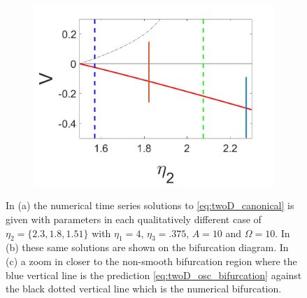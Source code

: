 \begin{figure}[H]
\begin{subfigure}{.5\textwidth}
 \includegraphics[width=\linewidth]{twoD/osc_bif_diagram_zoom.jpg}
 \caption{}
\end{subfigure}
\caption{In (a) the numerical time series solutions to \eqref{eq:twoD_canonical} is given with parameters in each qualitatively different case of $\eta_2=\{2.3,1.8,1.51\}$ with $\eta_1=4$, $\eta_3=.375$, $A=10$ and $\Omega = 10$. In (b) these same solutions are shown on the bifurcation diagram. In (c) a zoom in closer to the non-smooth bifurcation region where the blue vertical line is the prediction \eqref{eq:twoD_osc_bifurcation} against the black dotted vertical line which is the numerical bifurcation.}
\label{fig:twoD_osc_Vnumerics}
\end{figure}

